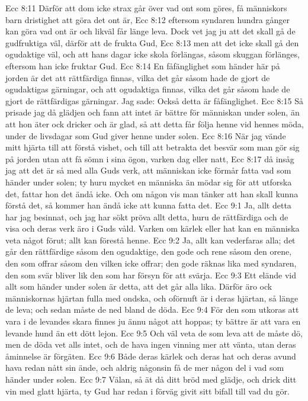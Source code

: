 Ecc 8:11  Därför att dom icke strax går över vad ont som göres, få människors barn dristighet att göra det ont är,
Ecc 8:12  eftersom syndaren hundra gånger kan göra vad ont är och likväl får länge leva. Dock vet jag ju att det skall gå de gudfruktiga väl, därför att de frukta Gud,
Ecc 8:13  men att det icke skall gå den ogudaktige väl, och att hans dagar icke skola förlängas, såsom skuggan förlänges, eftersom han icke fruktar Gud.
Ecc 8:14  En fåfänglighet som händer här på jorden är det att rättfärdiga finnas, vilka det går såsom hade de gjort de ogudaktigas gärningar, och att ogudaktiga finnas, vilka det går såsom hade de gjort de rättfärdigas gärningar. Jag sade: Också detta är fåfänglighet.
Ecc 8:15  Så prisade jag då glädjen och fann att intet är bättre för människan under solen, än att hon äter ock dricker och är glad, så att detta får följa henne vid hennes möda, under de livsdagar som Gud giver henne under solen.
Ecc 8:16  När jag vände mitt hjärta till att förstå vishet, och till att betrakta det besvär som man gör sig på jorden utan att få sömn i sina ögon, varken dag eller natt,
Ecc 8:17  då insåg jag att det är så med alla Guds verk, att människan icke förmår fatta vad som händer under solen; ty huru mycket en människa än mödar sig för att utforska det, fattar hon det ändå icke. Och om någon vis man tänker att han skall kunna förstå det, så kommer han ändå icke att kunna fatta det.
Ecc 9:1  Ja, allt detta har jag besinnat, och jag har sökt pröva allt detta, huru de rättfärdiga och de visa och deras verk äro i Guds våld. Varken om kärlek eller hat kan en människa veta något förut; allt kan förestå henne.
Ecc 9:2  Ja, allt kan vederfaras alla; det går den rättfärdige såsom den ogudaktige, den gode och rene såsom den orene, den som offrar såsom den vilken icke offrar; den gode räknas lika med syndaren, den som svär bliver lik den som har försyn för att svärja.
Ecc 9:3  Ett elände vid allt som händer under solen är detta, att det går alla lika. Därför äro ock människornas hjärtan fulla med ondska, och oförnuft är i deras hjärtan, så länge de leva; och sedan måste de ned bland de döda.
Ecc 9:4  För den som utkoras att vara i de levandes skara finnes ju ännu något att hoppas; ty bättre är att vara en levande hund än ett dött lejon.
Ecc 9:5  Och väl veta de som leva att de måste dö, men de döda vet alls intet, och de hava ingen vinning mer att vänta, utan deras åminnelse är förgäten.
Ecc 9:6  Både deras kärlek och deras hat och deras avund hava redan nått sin ände, och aldrig någonsin få de mer någon del i vad som händer under solen.
Ecc 9:7  Välan, så ät då ditt bröd med glädje, och drick ditt vin med glatt hjärta, ty Gud har redan i förväg givit sitt bifall till vad du gör.
